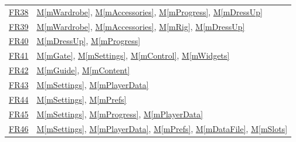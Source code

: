 \documentclass[10pt, titlepage]{article}
\newcommand{\srsurl}{https://team-hindsight.github.io/ophthamology-game/SRS/SRS.pdf}
\newcommand{\srsitemref}[2]{\href{\srsurl\#nameddest=#1}{#2}}
\newcommand{\mref}[1]{\texorpdfstring{\hyperref[md:#1]{M\ref*{#1}}}{M\ref*{#1}}}
\begin{document}
\begin{longtable}{@{}p{}p{}@{}}
\srsitemref{FR_PurchaseRefused}{FR38} & \mref{mWardrobe}, \mref{mAccessories}, \mref{mProgress}, \mref{mDressUp} \\
\srsitemref{FR_Equip}{FR39} & \mref{mWardrobe}, \mref{mAccessories}, \mref{mRig}, \mref{mDressUp} \\
\srsitemref{FR_NoRealMoney}{FR40} & \mref{mDressUp}, \mref{mProgress} \\
\srsitemref{FR_ParentGate}{FR41} & \mref{mGate}, \mref{mSettings}, \mref{mControl}, \mref{mWidgets} \\
\srsitemref{FR_ProcedureGuide}{FR42} & \mref{mGuide}, \mref{mContent} \\
\srsitemref{FR_Nickname}{FR43} & \mref{mSettings}, \mref{mPlayerData} \\
\srsitemref{FR_Preferences}{FR44} & \mref{mSettings}, \mref{mPrefs} \\
\srsitemref{FR_ResetJourney}{FR45} & \mref{mSettings}, \mref{mProgress}, \mref{mPlayerData} \\
\srsitemref{FR_ClearAllData}{FR46} & \mref{mSettings}, \mref{mPlayerData}, \mref{mPrefs}, \mref{mDataFile}, \mref{mSlots} \\

\end{longtable}
\end{document}
